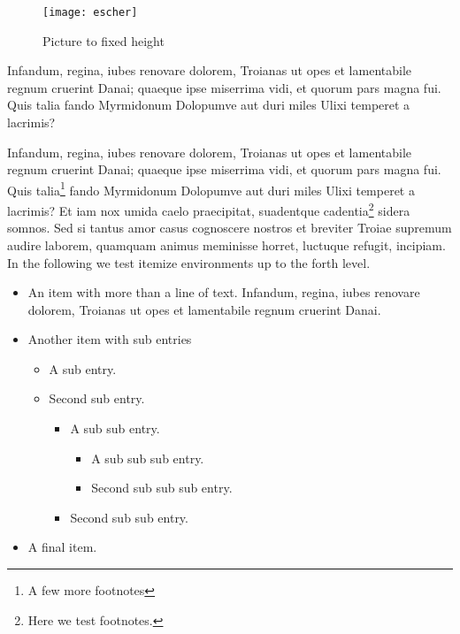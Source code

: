 \documentclass[
    ,final            %
  ]
  {aipproc}
\begin{document}
\begin{figure}
  \texttt{[image: escher]}
  \caption{Picture to fixed height}
\end{figure}

Infandum, regina, iubes renovare dolorem, Troianas ut opes et
lamentabile regnum cruerint Danai; quaeque ipse miserrima vidi, et
quorum pars magna fui. Quis talia fando Myrmidonum Dolopumve aut duri
miles Ulixi temperet a lacrimis?

Infandum, regina, iubes renovare dolorem, Troianas ut opes et
lamentabile regnum cruerint Danai; quaeque ipse miserrima vidi, et
quorum pars magna fui. Quis talia\footnote{A few more footnotes} fando
Myrmidonum Dolopumve aut duri miles Ulixi temperet a lacrimis? Et iam
nox umida caelo praecipitat, suadentque cadentia\footnote{Here we test
footnotes.} sidera somnos. Sed si tantus amor casus cognoscere nostros
et breviter Troiae supremum audire laborem, quamquam animus meminisse
horret, luctuque refugit, incipiam.
In the following we test itemize environments up to the forth level.
\begin{itemize}
\item
  An item with more than a line of text. Infandum, regina, iubes
  renovare dolorem, Troianas ut opes et lamentabile regnum cruerint
  Danai.
\item
  Another item with sub entries
  \begin{itemize}
  \item
   A sub entry.
  \item
   Second sub entry.
    \begin{itemize}
    \item
     A sub sub entry.
      \begin{itemize}
      \item
       A sub sub sub entry.
      \item
       Second sub sub sub entry.
      \end{itemize}
    \item
     Second sub sub entry.
    \end{itemize}
  \end{itemize}
\item
  A final item.
\end{itemize}

\end{document}
